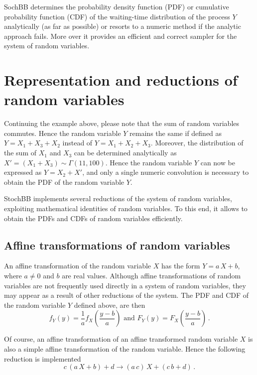 SochBB determines the probability density function (PDF) or cumulative probability function
(CDF) of the waiting-time distribution of the process $Y$ analytically (as far as
possible) or resorts to a numeric method if the analytic approach fails. More over it provides an efficient
and correct sampler for the system of random variables.


\section{Representation and reductions of random variables}
Continuing the example above, please note that the sum of random variables commutes. Hence the
random variable $Y$ remains the same if defined as $Y = X_1 + X_3 + X_2$ instead of 
$Y = X_1 + X_2 + X_3$. Moreover, the 
distribution of the sum of $X_1$ and $X_3$ can be determined analytically as 
$X' = (X_1+X_3)\sim\Gamma(11,100)$. Hence the random variable $Y$ can now be expressed as 
$Y = X_2 + X'$, and only a single numeric convolution is necessary to obtain the PDF of the
random variable $Y$. 

StochBB implements several reductions of the system of random variables,
exploiting mathematical identities of random variables. To this end, it allows to obtain the PDFs and CDFs
of random variables efficiently.

\subsection{Affine transformations of random variables}
An affine transformation of the random variable $X$ has the form $Y = a\,X+b$, where $a\neq 0$
and $b$ are real values. Although affine transformations of random variables are not frequently
used directly in a system of random variables, they may appear as a result of other reductions
of the system. The PDF and CDF of the random variable $Y$ defined above, are then 
\begin{equation}
 f_Y(y) = \frac{1}{a}f_X\left(\frac{y-b}{a}\right)\text{ and }
 F_Y(y) = F_X\left(\frac{y-b}{a}\right)\,. \nonumber
\end{equation}

Of course, an affine transformation of an affine transformed random variable $X$ is also a simple 
affine transformation of the random variable. Hence the following reduction is implemented
\begin{equation}
 c\,(a\,X+b)+d \longrightarrow (a\,c)\,X+(c\,b+d)\,.\nonumber
\end{equation}

